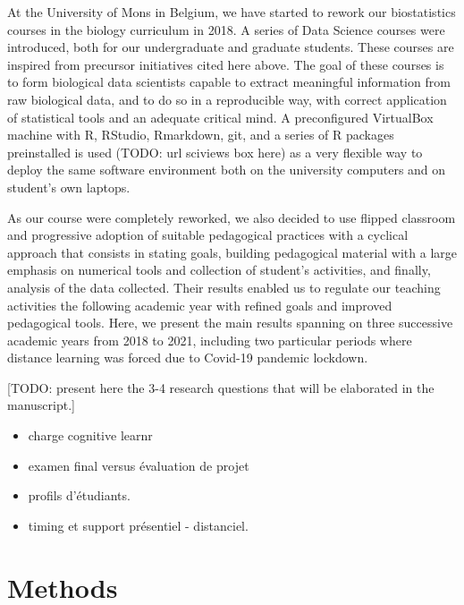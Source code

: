 \documentclass[
]{article}
\begin{document}
At the University of Mons in Belgium, we have started to rework our
biostatistics courses in the biology curriculum in 2018. A series of
Data Science courses were introduced, both for our undergraduate and
graduate students. These courses are inspired from precursor initiatives
cited here above. The goal of these courses is to form biological data
scientists capable to extract meaningful information from raw biological
data, and to do so in a reproducible way, with correct application of
statistical tools and an adequate critical mind. A preconfigured
VirtualBox machine with R, RStudio, Rmarkdown, git, and a series of R
packages preinstalled is used (TODO: url sciviews box here) as a very
flexible way to deploy the same software environment both on the
university computers and on student's own laptops.

As our course were completely reworked, we also decided to use flipped
classroom and progressive adoption of suitable pedagogical practices
with a cyclical approach that consists in stating goals, building
pedagogical material with a large emphasis on numerical tools and
collection of student's activities, and finally, analysis of the data
collected. Their results enabled us to regulate our teaching activities
the following academic year with refined goals and improved pedagogical
tools. Here, we present the main results spanning on three successive
academic years from 2018 to 2021, including two particular periods where
distance learning was forced due to Covid-19 pandemic lockdown.

{[}TODO: present here the 3-4 research questions that will be elaborated
in the manuscript.{]}

\begin{itemize}
\item
  charge cognitive learnr
\item
  examen final versus évaluation de projet
\item
  profils d'étudiants.
\item
  timing et support présentiel - distanciel.
\end{itemize}

\hypertarget{methods}{%
\section{Methods}\label{methods}}
\end{document}

